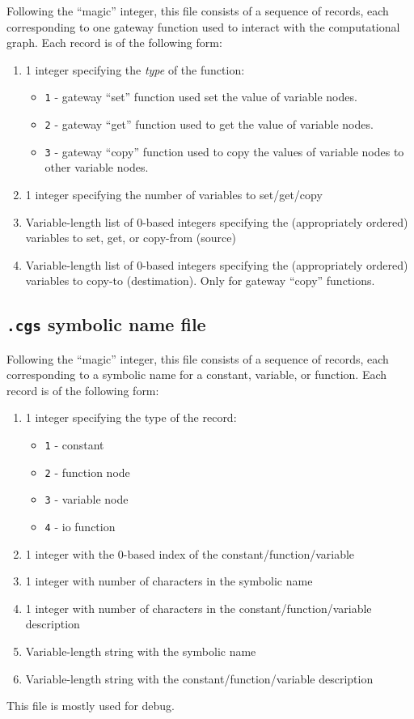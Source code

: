 \documentclass[11pt]{article}
\begin{document}
Following the ``magic'' integer, this file consists of a sequence of
records, each corresponding to one gateway function used to interact
with the computational graph. Each record is of the following form:
\begin{enumerate}
\item 1 integer specifying the \emph{type} of the function:
  \begin{itemize}
  \item \texttt{1} - gateway ``set'' function used set the value of
    variable nodes.
  \item \texttt{2} - gateway ``get'' function used to get the value of
    variable nodes.
  \item \texttt{3} - gateway ``copy'' function used to copy the values
    of variable nodes to other variable nodes.
  \end{itemize}
  
\item 1 integer specifying the number of variables to set/get/copy

\item Variable-length list of 0-based integers specifying the
  (appropriately ordered) variables to set, get, or copy-from (source)

\item Variable-length list of 0-based integers specifying the
  (appropriately ordered) variables to copy-to (destimation). Only for
  gateway ``copy'' functions.
\end{enumerate}

\subsection{\texttt{.cgs} symbolic name file}

Following the ``magic'' integer, this file consists of a sequence of
records, each corresponding to a symbolic name for a constant,
variable, or function. Each record is of the following form:
\begin{enumerate}
\item 1 integer specifying the type of the record:
  \begin{itemize}
  \item \texttt{1} - constant
  \item \texttt{2} - function node
  \item \texttt{3} - variable node
  \item \texttt{4} - io function
  \end{itemize}

\item 1 integer with the 0-based index of the
  constant/function/variable
\item 1 integer with number of characters in the symbolic name
\item 1 integer with number of characters in the
  constant/function/variable description
\item Variable-length string with the symbolic name
\item Variable-length string with the constant/function/variable
  description
\end{enumerate}
This file is mostly used for debug.

% 
% 
% 

\end{document}

